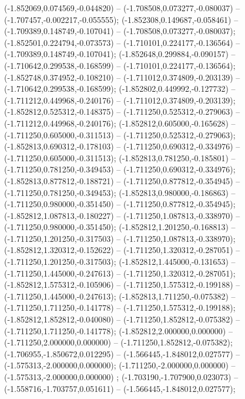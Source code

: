  (-1.852069,0.074569,-0.044820) -- (-1.708508,0.073277,-0.080037) -- (-1.707457,-0.002217,-0.055555);
 (-1.852308,0.149687,-0.058461) -- (-1.709389,0.148749,-0.107041) -- (-1.708508,0.073277,-0.080037);
 (-1.852501,0.224794,-0.073573) -- (-1.710101,0.224177,-0.136564) -- (-1.709389,0.148749,-0.107041);
 (-1.852648,0.299884,-0.090157) -- (-1.710642,0.299538,-0.168599) -- (-1.710101,0.224177,-0.136564);
 (-1.852748,0.374952,-0.108210) -- (-1.711012,0.374809,-0.203139) -- (-1.710642,0.299538,-0.168599);
 (-1.852802,0.449992,-0.127732) -- (-1.711212,0.449968,-0.240176) -- (-1.711012,0.374809,-0.203139);
 (-1.852812,0.525312,-0.148375) -- (-1.711250,0.525312,-0.279063) -- (-1.711212,0.449968,-0.240176);
 (-1.852812,0.605000,-0.165628) -- (-1.711250,0.605000,-0.311513) -- (-1.711250,0.525312,-0.279063);
 (-1.852813,0.690312,-0.178103) -- (-1.711250,0.690312,-0.334976) -- (-1.711250,0.605000,-0.311513);
 (-1.852813,0.781250,-0.185801) -- (-1.711250,0.781250,-0.349453) -- (-1.711250,0.690312,-0.334976);
 (-1.852813,0.877812,-0.188721) -- (-1.711250,0.877812,-0.354945) -- (-1.711250,0.781250,-0.349453);
 (-1.852813,0.980000,-0.186863) -- (-1.711250,0.980000,-0.351450) -- (-1.711250,0.877812,-0.354945);
 (-1.852812,1.087813,-0.180227) -- (-1.711250,1.087813,-0.338970) -- (-1.711250,0.980000,-0.351450);
 (-1.852812,1.201250,-0.168813) -- (-1.711250,1.201250,-0.317503) -- (-1.711250,1.087813,-0.338970);
 (-1.852812,1.320312,-0.152622) -- (-1.711250,1.320312,-0.287051) -- (-1.711250,1.201250,-0.317503);
 (-1.852812,1.445000,-0.131653) -- (-1.711250,1.445000,-0.247613) -- (-1.711250,1.320312,-0.287051);
 (-1.852812,1.575312,-0.105906) -- (-1.711250,1.575312,-0.199188) -- (-1.711250,1.445000,-0.247613);
 (-1.852813,1.711250,-0.075382) -- (-1.711250,1.711250,-0.141778) -- (-1.711250,1.575312,-0.199188);
 (-1.852812,1.852812,-0.040080) -- (-1.711250,1.852812,-0.075382) -- (-1.711250,1.711250,-0.141778);
 (-1.852812,2.000000,0.000000) -- (-1.711250,2.000000,0.000000) -- (-1.711250,1.852812,-0.075382);
 (-1.706955,-1.850672,0.012295) -- (-1.566445,-1.848012,0.027577) -- (-1.575313,-2.000000,0.000000);
 (-1.711250,-2.000000,0.000000) -- (-1.575313,-2.000000,0.000000) ;
 (-1.703190,-1.707900,0.023073) -- (-1.558716,-1.703757,0.051611) -- (-1.566445,-1.848012,0.027577);
